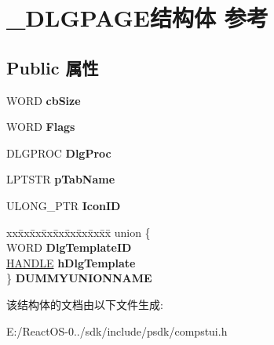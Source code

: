 \hypertarget{struct___d_l_g_p_a_g_e}{}\section{\+\_\+\+D\+L\+G\+P\+A\+G\+E结构体 参考}
\label{struct___d_l_g_p_a_g_e}
\subsection*{Public 属性}
\begin{DoxyCompactItemize}
\item 
\mbox{\label{struct___d_l_g_p_a_g_e_a514158acf8d4e14bab34a1787dec0b78}} 
W\+O\+RD {\bfseries cb\+Size}
\item 
\mbox{\label{struct___d_l_g_p_a_g_e_ac4e09edcca53d3db5cf60b0bbf30f383}} 
W\+O\+RD {\bfseries Flags}
\item 
\mbox{\label{struct___d_l_g_p_a_g_e_a83e45b5221470fcc1ee76d9dfbec0a2f}} 
D\+L\+G\+P\+R\+OC {\bfseries Dlg\+Proc}
\item 
\mbox{\label{struct___d_l_g_p_a_g_e_a46988d77e1f42d90fdbccbe768fff158}} 
L\+P\+T\+S\+TR {\bfseries p\+Tab\+Name}
\item 
\mbox{\label{struct___d_l_g_p_a_g_e_aaef7296d8df1eeac17ecd2a184e6e201}} 
U\+L\+O\+N\+G\+\_\+\+P\+TR {\bfseries Icon\+ID}
\item 
\mbox{\label{struct___d_l_g_p_a_g_e_ab5744452de241da7cd92b77b567fe744}} 
\begin{tabbing}
xx\=xx\=xx\=xx\=xx\=xx\=xx\=xx\=xx\=\kill
union \{\\
\>WORD {\bfseries DlgTemplateID}\\
\>\hyperlink{interfacevoid}{HANDLE} {\bfseries hDlgTemplate}\\
\} {\bfseries DUMMYUNIONNAME}\\

\end{tabbing}\end{DoxyCompactItemize}


该结构体的文档由以下文件生成\+:\begin{DoxyCompactItemize}
\item 
E\+:/\+React\+O\+S-\/0../sdk/include/psdk/compstui.\+h\end{DoxyCompactItemize}

